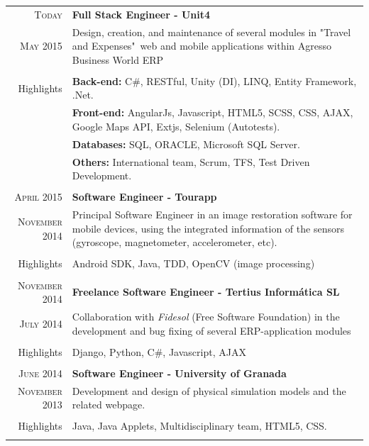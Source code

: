 \documentclass[a4paper,10pt]{article} %
\newcommand{\highlights}{\textcolor{linkcolour}{Highlights}}
\begin{document}
\begin{tabular}{r|p{11cm}}

\textsc{Today} & \textbf{Full Stack Engineer - Unit4} \\
\textsc{May 2015} 
& \small{Design, creation, and maintenance of several modules in "Travel and
Expenses"\  web and mobile applications within Agresso Business World ERP}  \\
& \\
\highlights & \textbf{Back-end:} C\#, RESTful, Unity (DI),
LINQ, Entity Framework, .Net. \\
& \textbf{Front-end:} AngularJs, Javascript, HTML5, SCSS, CSS,
AJAX, Google Maps API, Extjs, Selenium (Autotests). \\  
& \textbf{Databases:} SQL, ORACLE, Microsoft SQL Server. \\
& \textbf{Others:} International team, Scrum, TFS, Test Driven
Development. \\
\multicolumn{2}{c}{} \\


\textsc{April 2015} & \textbf{Software Engineer - Tourapp} \\
\textsc{November 2014}
& \footnotesize{Principal Software Engineer in an image restoration software for
mobile devices, using the integrated information of the sensors
(gyroscope, magnetometer, accelerometer, etc).}  \\
           & \\
\highlights & Android SDK, Java, TDD, OpenCV (image
processing)\\

\multicolumn{2}{c}{} \\


\textsc{November 2014} & \textbf{Freelance Software Engineer - Tertius
Informática SL} \\
\textsc{July 2014} 
           & \footnotesize{Collaboration with \textit{Fidesol} (Free Software
  Foundation) in the development and bug fixing of several ERP-application modules} \\
           & \\
\highlights & Django, Python, C\#, Javascript, AJAX \\

\multicolumn{2}{c}{} \\

\textsc{June 2014} & \textbf{Software Engineer - University of Granada} \\
\textsc{November 2013} 
& \footnotesize{Development and design of physical simulation models and the
related webpage.}\\
& \\
\highlights & Java, Java Applets, Multidisciplinary team, HTML5, CSS. \\
\multicolumn{2}{c}{} \\


\end{tabular}
\end{document}
